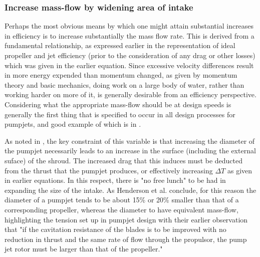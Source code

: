 \documentclass{article}\usepackage[]{graphicx}\usepackage[]{color}
\begin{document}
\subsubsection{Increase mass-flow by widening area of intake}
Perhaps the most obvious means by which one might attain substantial increases in efficiency is to increase substantially the mass flow rate.  This is derived from a fundamental relationship, as expressed earlier in the representation of ideal propeller and jet efficiency (prior to the consideration of any drag or other losses) which was given in the earlier equation.  Since excessive velocity differences result in more energy expended than momentum changed, as given by momentum theory and basic mechanics, doing work on a large body of water, rather than working harder on more of it, is generally desirable from an efficiency perspective.  Considering what the appropriate mass-flow should be at design speeds is generally the first thing that is specified to occur in all design processes for pumpjets, and good example of which is in \cite[6-7]{henderson1964}.

As noted in \cite{henderson1964}, the key constraint of this variable is that increasing the diameter of the pumpjet necessarily leads to an increase in the surface (including the external suface) of the shroud.  The increased drag that this induces must be deducted from the thrust that the pumpjet produces, or effectively increasing $\Delta T$ as given in earlier equations.  In this respect, there is "no free lunch" to be had in expanding the size of the intake.  As Henderson et al. conclude, for this reason the diameter of a pumpjet tends to be about 15\% or 20\% smaller than that of a corresponding propeller, whereas the diameter to have equivalent mass-flow, highlighting the tension set up in pumpjet design with their earlier observation that "if the cavitation resistance of the blades is to be improved with no reduction in thrust and the same rate of flow through the propulsor, the pump jet rotor must be larger than that of the propeller." \parencite[1]{henderson1964}
\end{document}
